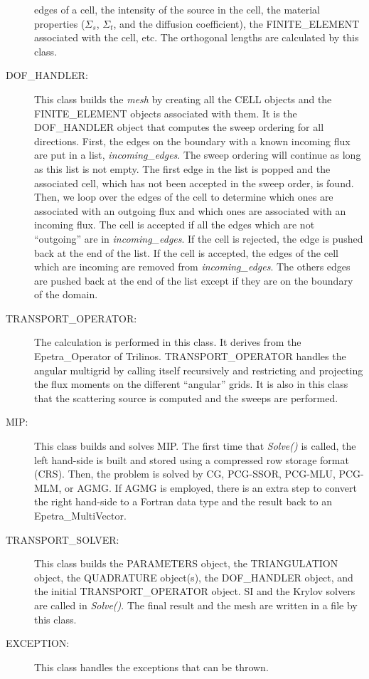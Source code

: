 \begin{description}
    edges of a cell, the intensity of the source in the cell, the material
    properties ($\Sigma_s$, $\Sigma_t$, and the diffusion coefficient), 
    the FINITE\_ELEMENT associated with the cell, etc. The orthogonal lengths are
    calculated by this class.
  \item[DOF\_HANDLER:] This class builds the \emph{mesh} by creating all the 
    CELL objects and the  FINITE\_ELEMENT objects associated with them. It is 
    the DOF\_HANDLER object that computes the sweep
    ordering for all directions. First, the edges on the boundary with a
    known incoming flux are put in a list, \emph{incoming\_edges}. The sweep
    ordering will continue as long as this list is not empty. The first edge 
    in the list is popped and the associated cell, which has not been
    accepted in the sweep order, is found. Then, we loop over the edges of 
    the cell to determine which ones are
    associated with an outgoing flux and which ones are associated with an
    incoming flux. The cell is accepted if all the
    edges which are not ``outgoing'' are in \emph{incoming\_edges}. If the cell is
    rejected, the edge is pushed back at the end of the list. If the cell is
    accepted, the edges of the cell which are incoming are removed from
    \emph{incoming\_edges}. The others edges are pushed back at the end of the
    list except if they are on the boundary of the domain.
  \item[TRANSPORT\_OPERATOR:] The calculation is performed in this class. 
    It derives from the Epetra\_Operator of Trilinos.
    TRANSPORT\_OPERATOR handles the angular multigrid by calling itself
    recursively and restricting and projecting the flux moments on the
    different ``angular'' grids. It is also in this class that the scattering 
    source is computed and the sweeps are  performed. 
  \item[MIP:] This class builds and solves MIP. The first time that
    \emph{Solve()} is called, the left hand-side is built and stored using a 
    compressed row storage format (CRS). Then, the problem is
    solved by CG, PCG-SSOR, PCG-MLU, PCG-MLM, or AGMG. If AGMG is employed, 
    there is an extra step to convert the right hand-side to a Fortran data type 
    and the result back to an Epetra\_MultiVector.
  \item[TRANSPORT\_SOLVER:] This class builds the PARAMETERS object, the
    TRIANGULATION object, the QUADRATURE object(s), the DOF\_HANDLER object,
    and the initial TRANSPORT\_OPERATOR object. SI and the Krylov solvers are
    called in \emph{Solve()}. The final result and the mesh are written in a file
    by this class.
  \item[EXCEPTION:] This class handles the exceptions that can be thrown.
\end{description}
